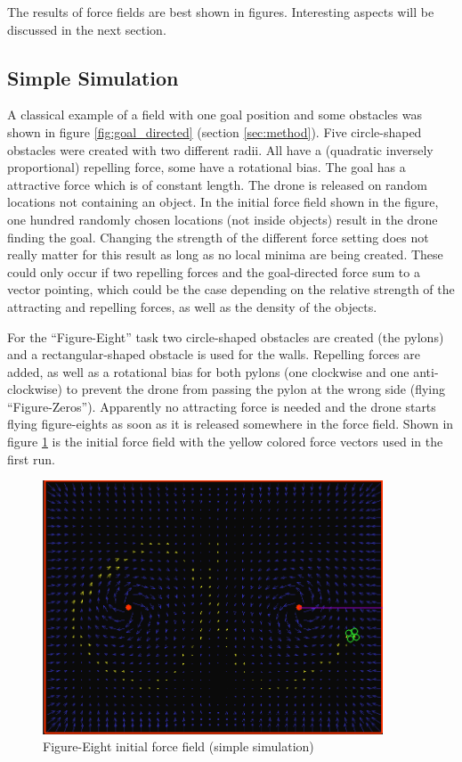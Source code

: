 \documentclass[11pt]{article}
\begin{document}
The results of force fields are best shown in figures. Interesting aspects will be discussed in the next section.


\subsection{Simple Simulation}

A classical example of a field with one goal position and some obstacles was shown in figure \ref{fig:goal_directed} (section \ref{sec:method}). Five circle-shaped obstacles were created with two different radii. All have a (quadratic inversely proportional) repelling force, some have a rotational bias. The goal has a attractive force which is of constant length. The drone is released on random locations not containing an object. In the initial force field shown in the figure, one hundred randomly chosen locations (not inside objects) result in the drone finding the goal. Changing the strength of the different force setting does not really matter for this result as long as no local minima are being created. These could only occur if two repelling forces and the goal-directed force sum to a vector pointing, which could be the case depending on the relative strength of the attracting and repelling forces, as well as the density of the objects.

For the ``Figure-Eight'' task two circle-shaped obstacles are created (the pylons) and a rectangular-shaped obstacle is used for the walls. Repelling forces are added, as well as a rotational bias for both pylons (one clockwise and one anti-clockwise) to prevent the drone from passing the pylon at the wrong side (flying ``Figure-Zeros''). Apparently no attracting force is needed and the drone starts flying figure-eights as soon as it is released somewhere in the force field. Shown in figure \ref{fig:simple_init} is the initial force field with the yellow colored force vectors used in the first run.

  \begin{figure}
    \begin{center}
    \includegraphics[width=0.9\textwidth]{img/sim_init}
    \caption{Figure-Eight initial force field (simple simulation)}
    \label{fig:simple_init}
    \end{center}
  \end{figure}
\end{document}
